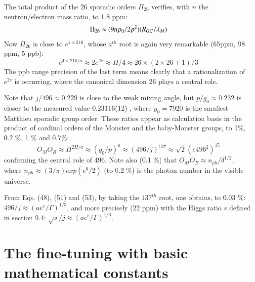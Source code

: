 \documentclass[twoside,draft]{article}
\begin{document}
\begin{sloppypar}
The total product of the 26 sporadic orders $\Pi_{26}$ verifies, with $n$ the neutron/electron mass ratio, to 1.8 ppm:
$$ \Pi_{26} \approx (9np_0/2p^2)(R_{GC}/\lambdabar_M )$$
Now $\Pi_{26}$ is close to $e^{4 \times 210}$, whose $a^{th}$ root is again very remarkable (65ppm, 98 ppm, 5 ppb):
\begin{equation}
e^{4 \times 210/a} \approx 2e^{2e} \approx H/4 \approx 26 \times (2 \times 26 + 1)/3
\end{equation}
The ppb range precision of the last term means clearly that a rationalization of $e^{2e}$ is occurring, where the canonical dimension 26 plays a central role.

Note that $j/496 \approx 0.229$ is close to the weak mixing angle, but $p/g_0 \approx 0.232$ is closer to the measured value 0.23116(12) \cite{Tanabashi}, where $g_0 = 7920 $ is the smallest Matthieu sporadic group order. These ratios appear as calculation basis in the product of cardinal orders of the Monster and the baby-Monster groups, to 1\%, 0.2 \%, 1 \% and 0.7\%:
\begin{equation}
O_MO_B\approx H^{2H/a} \approx (g_0/p)^a \approx (496/j)^{137} \approx \sqrt{2}(e496^2)^{15}
\end{equation}
confirming the central role of 496. Note also (0.1 \%) that $O_MO_B \approx  n_{ph}/\delta^{1/2}$, where $n_{ph}\approx (3/\pi) exp(e^6/2)$ (to 0.2 \%) is the photon number in the visible universe. 

From Eqs. (48), (51) and (53), by taking the $137^{th}$ root, one obtains, to 0.03 \%: $496/j \approx (ae^e/\Gamma)^{1/3}$, and more precisely (22 ppm) with the Higgs ratio $s$ defined in section 9.4: $\sqrt{s}/j \approx (ae^e/\Gamma)^{1/3}$.


\section{The fine-tuning with basic mathematical constants}






\end{sloppypar}
\end{document}
